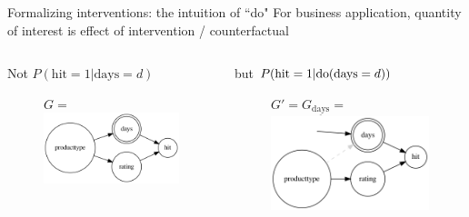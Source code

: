 \begin{frame}{Formalizing interventions: the intuition of ``do"}
    For business application, quantity of interest is effect of intervention / counterfactual %
    \begin{columns}[T] %
        \begin{column}{.48\textwidth}
        Not $P(\textrm{hit}=1 | \textrm{days}=d)$\newline
        \begin{figure}[ht]
            $G = $ \includegraphics[height=0.55\textwidth]{graphics/given_days}
        \end{figure}
        \end{column}%
        \begin{column}{.48\textwidth}
            but $P(\textrm{hit}=1 | \mathrm{do}(\textrm{days}=d))$\newline
                \begin{figure}[ht]
                $G' = G_{\underline{\textrm{days}}} =$
                \includegraphics[height=0.55\textwidth]{graphics/do_days}
            \end{figure}
        \end{column}%
    \end{columns}
\end{frame}

